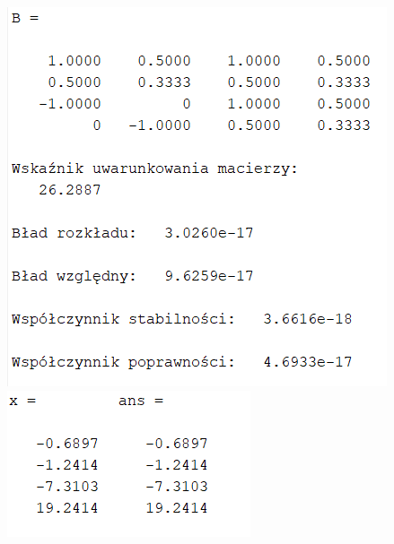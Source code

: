 \documentclass[11pt]{article}
\begin{document}
\begin{enumerate}
    \begin{figure}[h]
     \centering
     \includegraphics[scale=0.8]{B1}
     \includegraphics[scale=0.9]{B2}
    \end{figure}

    \break
  


\end{enumerate}
\end{document}

